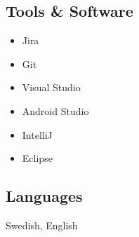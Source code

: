 \documentclass{article}
\begin{document}
\begin{minipage}[t]{0.28\textwidth}
		\subsection*{\textcolor{colorBlue}{Tools \& Software}}
		\begin{itemize}
			\item Jira
			\item Git
			\item Visual Studio
			\item Android Studio
			\item IntelliJ
			\item Eclipse
		\end{itemize}
		\vspace{-10pt} %
		\subsection*{\textcolor{colorBlue}{Languages}}
		Swedish, English
	\end{minipage}
	
\vspace{40pt} %
\end{document}

